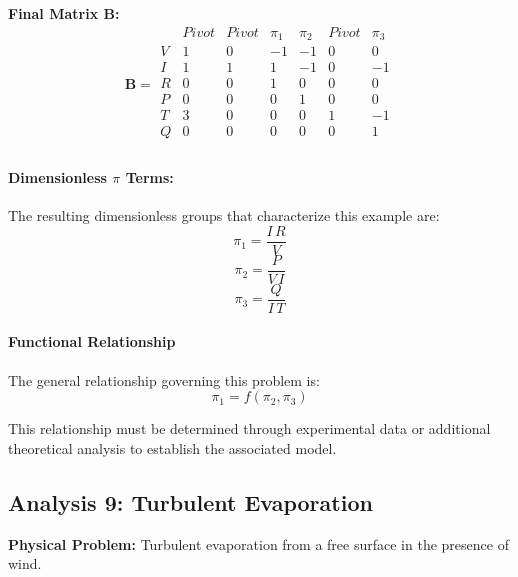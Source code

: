         \textbf{Final Matrix $\mathbf{B}$:}
        \[\mathbf{B} = \begin{array}{r|rrrrrr}
        & Pivot & Pivot & \pi_{1} & \pi_{2} & Pivot & \pi_{3} \\
        \hline
        V & 1 & 0 & -1 & -1 & 0 & 0 \\
I & 1 & 1 & 1 & -1 & 0 & -1 \\
R & 0 & 0 & 1 & 0 & 0 & 0 \\
P & 0 & 0 & 0 & 1 & 0 & 0 \\
T & 3 & 0 & 0 & 0 & 1 & -1 \\
Q & 0 & 0 & 0 & 0 & 0 & 1 \\

        \end{array}\]

        \paragraph{Dimensionless $\pi$ Terms: }
        The resulting dimensionless groups that characterize this example are:
\begin{equation}
\pi_{1} = \frac{I \, R}{V}
\end{equation}
\begin{equation}
\pi_{2} = \frac{P}{V \, I}
\end{equation}
\begin{equation}
\pi_{3} = \frac{Q}{I \, T}
\end{equation}

                    \paragraph{Functional Relationship}
                    The general relationship governing this problem is:
                    \begin{equation}
                    \pi_1 = f(\pi_2,\pi_3)
                    \end{equation}

                    This relationship must be determined through experimental data or additional theoretical analysis to establish the associated model.


\subsection{Analysis 9: Turbulent Evaporation}
\label{sec:Turbulent_Evaporation}

\begin{problembox}
\textbf{Physical Problem:} Turbulent evaporation from a free surface in the presence of wind.
\end{problembox}

